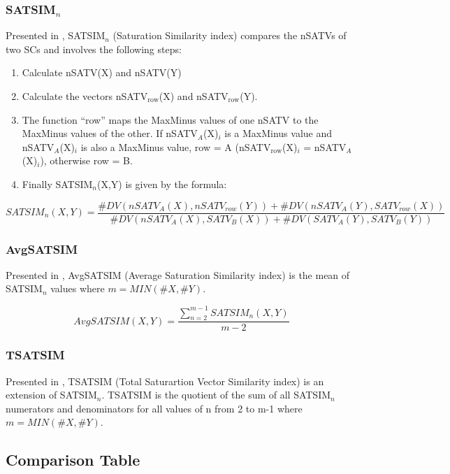\documentclass{article}
\begin{document}
\subsubsection{SATSIM$_{n}$}
\label{sec-12-9-2}

Presented in \citet[chap. 2.4]{Buchler1997}, SATSIM$_{n}$ (Saturation
Similarity index) compares the nSATVs of two SCs and involves the
following steps:
\begin{enumerate}
\item Calculate nSATV(X) and nSATV(Y)
\item Calculate the vectors nSATV$_{\mathrm{row}}$(X) and nSATV$_{\mathrm{row}}$(Y).
\item The function ``row'' maps the MaxMinus values of one nSATV to the
   MaxMinus values of the other. If nSATV$_{A}$(X)$_{i}$ is a MaxMinus
   value and nSATV$_{A}$(X)$_{i}$ is also a MaxMinus value, row = A
   (nSATV$_{\mathrm{row}}$(X)$_{i}$ = nSATV$_{A}$(X)$_{i}$), otherwise row = B.
\item Finally SATSIM$_{n}$(X,Y) is given by the formula:
\end{enumerate}

$$SATSIM_{n}(X,Y)=\frac{\#DV(nSATV_{A}(X),nSATV_{row}(Y))+\#DV(nSATV_{A}(Y),SATV_{row}(X))}{\#DV(nSATV_{A}(X),SATV_{B}(X))+\#DV(SATV_{A}(Y),SATV_{B}(Y))}$$
\subsubsection{AvgSATSIM}
\label{sec-12-9-3}

Presented in \citet[chap. 2.10]{Buchler1997}, AvgSATSIM (Average
Saturation Similarity index) is the mean of SATSIM$_{n}$ values where
$m=MIN(\#X,\#Y)$.

$$ AvgSATSIM(X,Y)=\frac{\sum_{n=2}^{m-1}{SATSIM_{n}(X,Y)}}{m-2}$$
\subsubsection{TSATSIM}
\label{sec-12-9-4}

Presented in \citet[chap. 2.10]{Buchler1997}, TSATSIM (Total
Saturartion Vector Similarity index) is an extension of
SATSIM$_{n}$. TSATSIM is the quotient of the sum of all SATSIM$_{n}$
numerators and denominators for all values of n from 2 to m-1 where
$m=MIN(\#X,\#Y)$.
\subsection{Comparison Table}
\label{sec-12-10}
\end{document}
